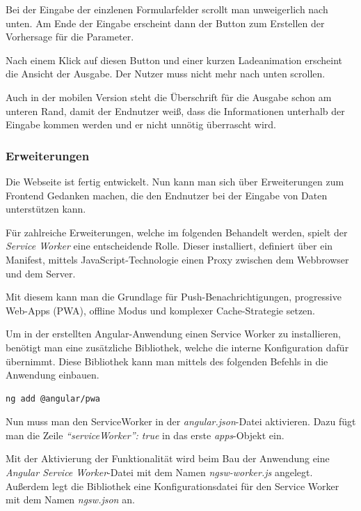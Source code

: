 Bei der Eingabe der einzlenen Formularfelder scrollt man unweigerlich nach unten. Am Ende der Eingabe erscheint dann der
Button zum Erstellen der Vorhersage für die Parameter.

Nach einem Klick auf diesen Button und einer kurzen Ladeanimation erscheint die Ansicht der Ausgabe. Der Nutzer muss
nicht mehr nach unten scrollen.

Auch in der mobilen Version steht die Überschrift für die Ausgabe schon am unteren Rand, damit der Endnutzer weiß, dass
die Informationen unterhalb der Eingabe kommen werden und er nicht unnötig überrascht wird.

\subsubsection{Erweiterungen}
Die Webseite ist fertig entwickelt. Nun kann man sich über Erweiterungen zum Frontend Gedanken machen, die den Endnutzer
bei der Eingabe von Daten unterstützen kann.

Für zahlreiche Erweiterungen, welche im folgenden Behandelt werden, spielt der \textit{Service Worker} eine
entscheidende Rolle. Dieser installiert, definiert über ein Manifest, mittels JavaScript-Technologie einen Proxy
zwischen dem Webbrowser und dem Server.

Mit diesem kann man die Grundlage für Push-Benachrichtigungen, progressive Web-Apps (PWA), offline Modus und komplexer
Cache-Strategie setzen.

Um in der erstellten Angular-Anwendung einen Service Worker zu installieren, benötigt man eine zusätzliche Bibliothek,
welche die interne Konfiguration dafür übernimmt. Diese Bibliothek kann man mittels des folgenden Befehls in die
Anwendung einbauen.

\begin{lstlisting}[caption=Hinzufügen der PWA-Bibliothek, label=ls:umsetzung_angularaddpwa]
    ng add @angular/pwa
\end{lstlisting}

Nun muss man den ServiceWorker in der \textit{angular.json}-Datei aktivieren. Dazu fügt man die Zeile
\textit{\enquote{serviceWorker}: true} in das erste \textit{apps}-Objekt ein.

Mit der Aktivierung der Funktionalität wird beim Bau der Anwendung eine \textit{Angular Service Worker}-Datei mit dem
Namen \textit{ngsw-worker.js} angelegt. Außerdem legt die Bibliothek eine Konfigurationsdatei für den Service Worker mit
dem Namen \textit{ngsw.json} an.

